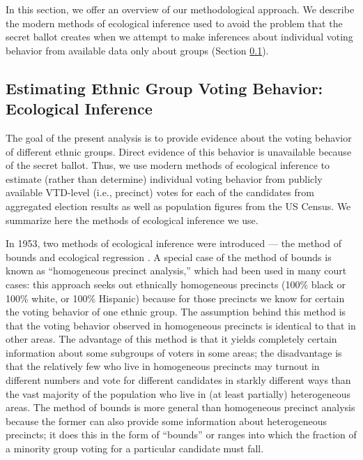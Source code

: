 \documentclass[12pt]{article}
\begin{document}
In this section, we offer an overview of our methodological approach.
We describe the modern methods of ecological inference used to avoid
the problem that the secret ballot creates when we attempt to make
inferences about individual voting behavior from available data only
about groups (Section \ref{s:ei}).

\subsection{Estimating Ethnic Group Voting Behavior: Ecological Inference}
\label{s:ei}

The goal of the present analysis is to provide evidence about the
voting behavior of different ethnic groups. Direct evidence of this
behavior is unavailable because of the secret ballot. Thus, we use
modern methods of ecological inference to estimate (rather than
determine) individual voting behavior from publicly available
VTD-level (i.e., precinct) votes for each of the candidates from
aggregated election results as well as population figures from the US
Census.  We summarize here the methods of ecological inference we use.

In 1953, two methods of ecological inference were introduced --- the
method of bounds \citep{DunDav53} and ecological regression
\citep{Goodman53}. A special case of the method of bounds is known
as ``homogeneous precinct analysis,'' which had been used in many
court cases: this approach seeks out ethnically homogeneous precincts
(100\% black or 100\% white, or 100\% Hispanic) because for those
precincts we know for certain the voting behavior of one ethnic group.
The assumption behind this method is that the voting behavior observed
in homogeneous precincts is identical to that in other areas. The
advantage of this method is that it yields completely certain
information about some subgroups of voters in some areas; the
disadvantage is that the relatively few who live in homogeneous
precincts may turnout in different numbers and vote for different
candidates in starkly different ways than the vast majority of the
population who live in (at least partially) heterogeneous areas.  The
method of bounds is more general than homogeneous precinct analysis
because the former can also provide some information about
heterogeneous precincts; it does this in the form of ``bounds'' or
ranges into which the fraction of a minority group voting for a
particular candidate must fall.
\end{document}
